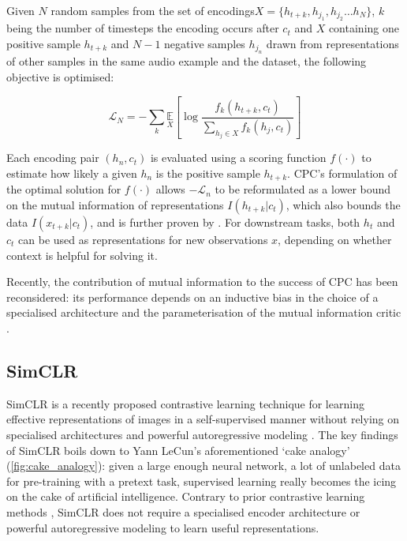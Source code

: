 Given $N$ random samples from the set of encodings\linebreak $X = \{h_{t+k}, h_{j_1}, h_{j_2} \hdots h_N\}$, $k$ being the number of timesteps the encoding occurs after $c_t$ and $X$ containing one positive sample $h_{t+k}$ and $N-1$ negative samples $h_{j_{n}}$ drawn from representations of other samples in the same audio example and the dataset, the following objective is optimised:

\begin{equation}
    \mathcal{L}_{N}=-\sum_{k} \underset{X}{\mathbb{E}}\left[\log \frac{f_{k}\left(h_{t+k}, c_{t}\right)}{\sum_{h_{j} \in X} f_{k}\left(h_{j}, c_{t}\right)}\right]
\end{equation}

Each encoding pair $(h_n, c_t)$ is evaluated using a scoring function $f(\cdot)$ to estimate how likely a given $h_n$ is the positive sample $h_{t+k}$.
CPC's formulation of the optimal solution for $f(\cdot)$ allows $-\mathcal{L}_n$ to be reformulated as a lower bound on the mutual information of representations $I(h_{t+k} | c_t)$, which also bounds the data $I(x_{t+k} | c_t)$, and is further proven by \cite{poole_variational_2019}.
For downstream tasks, both $h_t$ and $c_t$ can be used as representations for new observations $x$, depending on whether context is helpful for solving it.

Recently, the contribution of mutual information to the success of CPC has been reconsidered: its performance depends on an inductive bias in the choice of a specialised architecture and the parameterisation of the mutual information critic \cite{Tschannen2020OnMI}.



\subsection{SimCLR}
SimCLR is a recently proposed contrastive learning technique for learning effective representations of images in a self-supervised manner without relying on specialised architectures and powerful autoregressive modeling \cite{chen_simple_2020}.
The key findings of SimCLR boils down to Yann LeCun's aforementioned `cake analogy' (\ref{fig:cake_analogy}): given a large enough neural network, a lot of unlabeled data for pre-training with a pretext task, supervised learning really becomes the icing on the cake of artificial intelligence.
Contrary to prior contrastive learning methods \cite{oord_representation_2019,henaff2019data,hjelm_learning_2019}, SimCLR does not require a specialised encoder architecture or powerful autoregressive modeling to learn useful representations.

